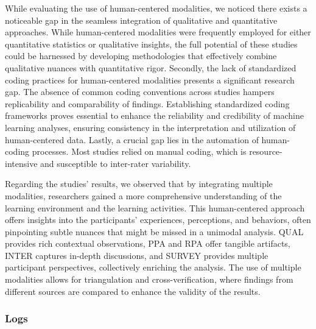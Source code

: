 \documentclass[manuscript,screen,review]{acmart}
\begin{document}
While evaluating the use of human-centered modalities, we noticed there exists a noticeable gap in the seamless integration of qualitative and quantitative approaches. While human-centered modalities were frequently employed for either quantitative statistics or qualitative insights, the full potential of these studies could be harnessed by developing methodologies that effectively combine qualitative nuances with quantitative rigor. Secondly, the lack of standardized coding practices for human-centered modalities presents a significant research gap. The absence of common coding conventions across studies hampers replicability and comparability of findings. Establishing standardized coding frameworks proves essential to enhance the reliability and credibility of machine learning analyses, ensuring consistency in the interpretation and utilization of human-centered data. Lastly, a crucial gap lies in the automation of human-coding processes. Most studies relied on manual coding, which is resource-intensive and susceptible to inter-rater variability.

Regarding the studies' results, we observed that by integrating multiple modalities, researchers gained a more comprehensive understanding of the learning environment and the learning activities. This human-centered approach offers insights into the participants' experiences, perceptions, and behaviors, often pinpointing subtle nuances that might be missed in a unimodal analysis. QUAL provides rich contextual observations, PPA and RPA offer tangible artifacts, INTER captures in-depth discussions, and SURVEY provides multiple participant perspectives, collectively enriching the analysis. The use of multiple modalities allows for triangulation and cross-verification, where findings from different sources are compared to enhance the validity of the results.
    
\subsubsection{Logs}
\end{document}
